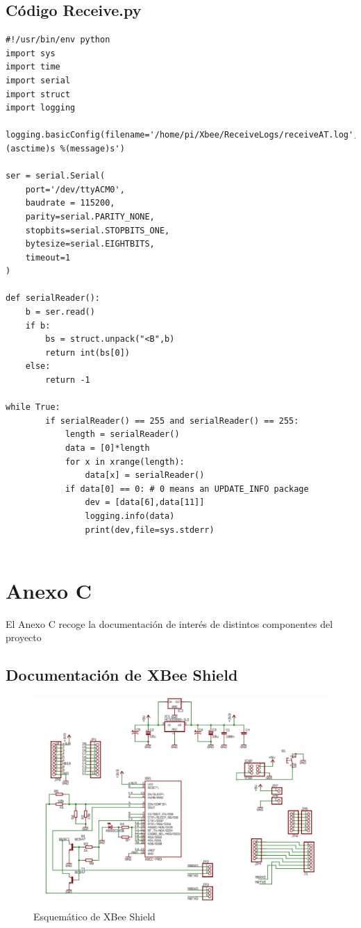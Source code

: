 \section{Código Receive.py}\label{anexo:receive}

\begin{lstlisting}[frame=leftline, caption={Receive.py}, label=code:Receive]
#!/usr/bin/env python
import sys
import time
import serial
import struct
import logging

logging.basicConfig(filename='/home/pi/Xbee/ReceiveLogs/receiveAT.log',level=logging.DEBUG,format='%(asctime)s %(message)s')

ser = serial.Serial(
	port='/dev/ttyACM0',
	baudrate = 115200,
	parity=serial.PARITY_NONE,
	stopbits=serial.STOPBITS_ONE,
	bytesize=serial.EIGHTBITS,
	timeout=1
)

def serialReader():
    b = ser.read()
    if b:
        bs = struct.unpack("<B",b)
        return int(bs[0])
    else:
        return -1

while True:
        if serialReader() == 255 and serialReader() == 255:
            length = serialReader()
            data = [0]*length
            for x in xrange(length):
                data[x] = serialReader()
            if data[0] == 0: # 0 means an UPDATE_INFO package
                dev = [data[6],data[11]]
                logging.info(data)
                print(dev,file=sys.stderr)
                
\end{lstlisting}

\chapter{Anexo C}

El Anexo C recoge la documentación de interés de distintos componentes del proyecto

\section{Documentación de XBee Shield}\label{anexo:XBShield}

\begin{figure}[H]
\centering
\includegraphics[width=1\textwidth]{figuras/XbeeShSch.png}
\caption{Esquemático de XBee Shield}
\label{fig:esquemaXBShield}
\end{figure}

